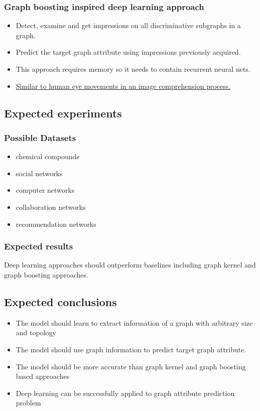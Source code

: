 \documentclass{article}
\begin{document}
\subsubsection{Graph boosting inspired deep learning approach}
\begin{itemize}
	\item Detect, examine and get impressions on all discriminative subgraphs in a graph.
	\item Predict the target graph attribute using impressions previously acquired.
	\item This approach requires memory so it needs to contain recurrent neural nets.
	\item \href{http://blog.art21.org/2013/01/07/tracking-the-gaze/#.WG8lYN9ifRb}
	{Similar to human eye movements in an image comprehension process.}
\end{itemize}

\subsection{Expected experiments}

\subsubsection{Possible Datasets}
\begin{itemize}
	\item chemical compounds
	\item social networks
	\item computer networks
	\item collaboration networks
	\item recommendation networks
\end{itemize}

\subsubsection{Expected results}
Deep learning approaches should outperform baselines including graph kernel and graph boosting approaches.

\subsection{Expected conclusions}
\begin{itemize}
	\item The model should learn to extract information of a graph with arbitrary size and topology
	\item The model should use graph information to predict target graph attribute.
	\item The model should be more accurate than graph kernel and graph boosting based approaches
	\item Deep learning can be successfully applied to graph attribute prediction problem
\end{itemize}
\end{document}
